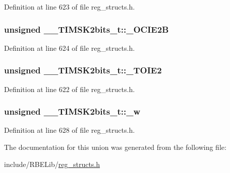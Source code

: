 Definition at line 623 of file reg\+\_\+structs.\+h.

\hypertarget{union_____t_i_m_s_k2bits__t_a01be8ad50ce3d572237ac5e3a2931306}{
\subsubsection[{\+\_\+\+O\+C\+I\+E2\+B}]{\setlength{\rightskip}{0pt plus 5cm}unsigned \+\_\+\+\_\+\+T\+I\+M\+S\+K2bits\+\_\+t\+::\+\_\+\+O\+C\+I\+E2\+B}}\label{union_____t_i_m_s_k2bits__t_a01be8ad50ce3d572237ac5e3a2931306}


Definition at line 624 of file reg\+\_\+structs.\+h.

\hypertarget{union_____t_i_m_s_k2bits__t_a8ca920f458312e651cf1e4fdb5b3f035}{
\subsubsection[{\+\_\+\+T\+O\+I\+E2}]{\setlength{\rightskip}{0pt plus 5cm}unsigned \+\_\+\+\_\+\+T\+I\+M\+S\+K2bits\+\_\+t\+::\+\_\+\+T\+O\+I\+E2}}\label{union_____t_i_m_s_k2bits__t_a8ca920f458312e651cf1e4fdb5b3f035}


Definition at line 622 of file reg\+\_\+structs.\+h.

\hypertarget{union_____t_i_m_s_k2bits__t_a21475061ea38cb2095683e843fa70029}{
\subsubsection[{\+\_\+w}]{\setlength{\rightskip}{0pt plus 5cm}unsigned \+\_\+\+\_\+\+T\+I\+M\+S\+K2bits\+\_\+t\+::\+\_\+w}}\label{union_____t_i_m_s_k2bits__t_a21475061ea38cb2095683e843fa70029}


Definition at line 628 of file reg\+\_\+structs.\+h.



The documentation for this union was generated from the following file\+:\begin{DoxyCompactItemize}
\item 
include/\+R\+B\+E\+Lib/\hyperlink{reg__structs_8h}{reg\+\_\+structs.\+h}\end{DoxyCompactItemize}
